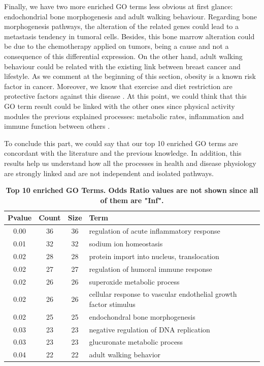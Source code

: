 \documentclass[9pt,twocolumn,twoside]{gsajnl}
\begin{document}
Finally, we have two more enriched GO terms less obvious at first glance: endochondrial bone morphogenesis and adult walking behaviour. Regarding bone morphogenesis pathways, the alteration of the related genes could lead to a metastasis tendency in tumoral cells. Besides, this bone marrow alteration could be due to the chemotherapy applied on tumors, being a cause and not a consequence of this differential expression. On the other hand, adult walking behaviour could be related with the existing link between breast cancer and lifestyle. As we comment at the beginning of this section, obesity is a known risk factor in cancer. Moreover, we know that exercise and diet restriction are protective factors against this disease  \citep{Chlebowski}. At this point, we could think that this GO term result could be linked with the other ones since physical activity modules the previous explained processes: metabolic rates, inflammation and immune function between others \citep{McTiernan2008}.
\vspace{2mm}

To conclude this part, we could say that our top 10 enriched GO terms are concordant with the literature and the previous knowledge. In addition, this results help us understand how all the processes in health and disease physiology are strongly linked and are not independent and isolated pathways.


\begin{table}[ht]
\centering
\caption{\bf Top 10 enriched GO Terms. Odds Ratio values are not shown since all of them are "Inf".}
\begin{tableminipage}{\textwidth}
\begin{tabular}{cccp{3cm}}
  \hline
 Pvalue & Count & Size & Term\\ 
  \hline
0.00 &  36 &  36 & regulation of acute inflammatory response\\ 
0.01 &  32 &  32 & sodium ion homeostasis \\ 
0.02 &  28 &  28 & protein import into nucleus, translocation\\ 
0.02 &  27 &  27 & regulation of humoral immune response\\ 
0.02 &  26 &  26 & superoxide metabolic process \\ 
0.02&  26 &  26 & cellular response to vascular endothelial growth factor stimulus\\ 
0.02 &  25 &  25 & endochondral bone morphogenesis\\ 
0.03 &  23 &  23 & negative regulation of DNA replication\\ 
0.03 &  23 &  23 & glucuronate metabolic process\\ 
0.04 &  22 &  22 & adult walking behavior\\ 
   \hline
\end{tabular}
\end{tableminipage}
\label{table}
\end{table}
\end{document}
